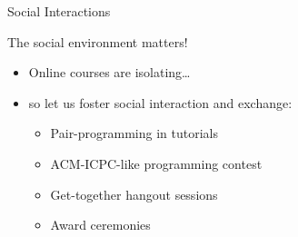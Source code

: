 \documentclass{beamer}
\begin{document}

\begin{frame}{Social Interactions}
\centerline{\Large{\alert{The social environment matters!}}}
\pause
\begin{itemize}[<+->]
\item Online courses are isolating\dots
\item[] so let us foster social interaction and exchange:
\begin{itemize}
  \item Pair-programming in tutorials
  \item ACM-ICPC-like programming contest
  \item Get-together hangout sessions
  \item Award ceremonies
\end{itemize}
\end{itemize}
\end{frame}



\end{document}
